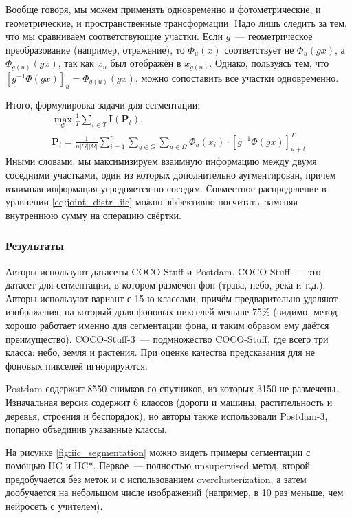     Вообще говоря, мы можем применять одновременно и фотометрические, и геометрические, и пространственные трансформации.
    Надо лишь следить за тем, что мы сравниваем соответствующие участки.
    Если $g$~--- геометрическое преобразование (например, отражение), то $\Phi_u(x)$ соответствует не $\Phi_u(gx)$,
    а $\Phi_{g(u)}(gx)$, так как $x_u$ был отображён в $x_{g(u)}$.
    Однако, пользуясь тем, что $\left[g^{-1} \Phi(g x) \right]_u = \Phi_{g(u)}(g x)$, можно сопоставить все участки одновременно.

    Итого, формулировка задачи для сегментации:
    \begin{gather}
            \max_{\Phi} \frac{1}{T} \sum_{t \in T} \bm{I}(\bm{P}_t),\\
            \bm{P}_t = \frac{1}{n |G| |\Omega|} \sum_{i=1}^{n} \sum_{g \in G} \sum_{u \in \Omega} \Phi_u(x_i) \cdot \left[g^{-1} \Phi(g x) \right]_{u + t}^T \label{eq:joint_distr_iic}
    \end{gather}
    Иными словами, мы максимизируем взаимную информацию между двумя соседними участками, один из которых дополнительно аугментирован,
    причём взаимная информация усредняется по соседям.
    Совместное распределение в уравнении \ref{eq:joint_distr_iic} можно эффективно посчитать, заменяя внутреннюю сумму на операцию свёртки.

    \subsubsection{Результаты}
    Авторы используют датасеты COCO-Stuff и Postdam.
    COCO-Stuff~--- это датасет для сегментации, в котором размечен фон (трава, небо, река и т.д.).
    Авторы используют вариант с 15-ю классами, причём предварительно удаляют изображения, 
    на который доля фоновых пикселей меньше 75\% (видимо, метод хорошо работает именно для сегментации фона, 
    и таким образом ему даётся преимущество).
    COCO-Stuff-3~--- подмножество COCO-Stuff, где всего три класса: небо, земля и растения.
    При оценке качества предсказания для не фоновых пикселей игнорируются.
    
    Postdam содержит 8550 снимков со спутников, из которых 3150 не размечены.
    Изначальная версия содержит 6 классов (дороги и машины, растительность и деревья, строения и беспорядок),
    но авторы также использовали Postdam-3, попарно объединив указанные классы.

    На рисунке \ref{fig:iic_segmentation} можно видеть примеры сегментации с помощью IIC и IIC*.
    Первое~--- полностью unsupervised метод, второй предобучается без меток и с использованием overclusterization, а затем дообучается на небольшом числе изображений 
    (например, в 10 раз меньше, чем нейросеть с учителем).


